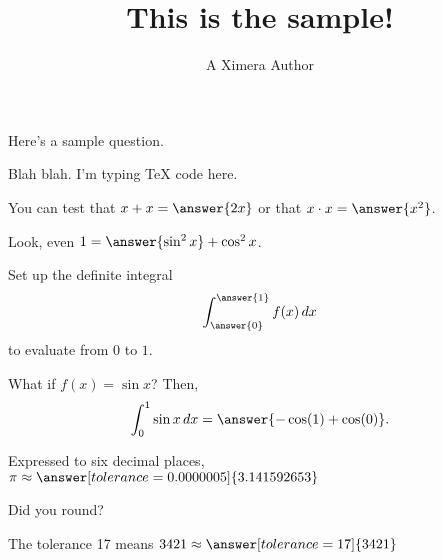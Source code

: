 \documentclass{ximera}
\title{This is the sample!}
\author{A Ximera Author}
\begin{document}
\maketitle

Here's a sample question.

\begin{problem}
\begin{multipleChoice}
\end{multipleChoice}
\end{problem}

\begin{problem}
  \begin{multipleChoice}
  \end{multipleChoice}
\end{problem}

Blah blah.  I'm typing TeX code here.

\begin{problem}
   You can test that $x + x = \answer{2x}$ or that $x \cdot x = \answer{x^2}$.

  Look, even $1 = \answer{\sin^2 x} + \cos^2 x$.
\end{problem}

\begin{problem}
  Set up the definite integral
    \[
      \int_{\answer{0}}^{\answer{1}} f(x) \, dx
    \]
    to evaluate from $0$ to $1$.

  \begin{question}
    What if $f(x) = \sin x$?  Then,
    \[
       \int_0^1 \sin x \, dx = \answer{-\cos(1) + \cos(0)}.
    \]
  \end{question}
\end{problem}

\begin{problem}
   Expressed to six decimal places,  $\pi \approx \answer[tolerance=0.0000005]{3.141592653}$
   \begin{hint}
   Did you round?
   \end{hint}
\end{problem}

\begin{problem}
   The tolerance 17 means $3421 \approx \answer[tolerance=17]{3421}$
\end{problem}
\end{document}
